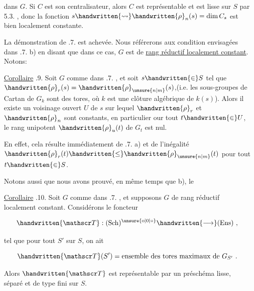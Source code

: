 
dans $G$. Si $C$ est son centralisateur, alors $C$ est représentable et est lisse sur $S$ par  5.3. , donc la fonction $s\handwritten{\leadsto}\handwritten{\rho}_n(s)=\dim C_s$ est bien localement constante.

 La démonstration de .7. est achevée. Nous référerons aux condition envisagées dans .7. b) en disant que dans ce cas, $G$ est de \uline{rang réductif localement constant}. Notons:

\uline{Corollaire} .9. Soit $G$ comme dans .7. , et soit $s\handwritten{\in}S$ tel que  $\handwritten{\rho}_r(s)=\handwritten{\rho}_{\unsure{n|m}}(s)$,(i.e. les sous-groupes de Cartan de $G_k$ sont des tores, où $k$ est une clôture algébrique de $k(s)$). Alors il existe un voisinage  ouvert $U$ de $s$ sur lequel $\handwritten{\rho}_r$ et $\handwritten{\rho}_n$ sont constants, en particulier our tout $t\handwritten{\in}U$, le rang unipotent $\handwritten{\rho}_u(t)$ de $G_t$ est nul.

En effet,  cela résulte immédiatement de .7. a) et de l'inégalité $\handwritten{\rho}_r(t)\handwritten{\leq}\handwritten{\rho}_{\unsure{n|m}}(t)$ pour tout $t\handwritten{\in}S$.

Notons aussi que nous avons prouvé, en même temps que b), le

\uline{Corollaire} .10. Soit $G$ comme dans .7. , et supposons $G$ de rang réductif localement constant. Considérons le foncteur

\[
\handwritten{\mathscr T}:(\mathrm{Sch})^{\unsure{\mathrm{o}|0|\circ}}\handwritten{\longrightarrow}(\mathrm{Ens})\ ,
\]

tel que pour tout $S'$ sur $S$, on ait

\[
\handwritten{\mathscr T}(S')=\text{ensemble des tores maximaux de }G_{S'}\ .
\]

Alors $\handwritten{\mathscr T}$ est représentable par un préschéma lisse, séparé et de type fini sur $S$.

